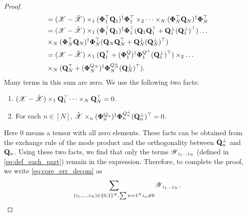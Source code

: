 \begin{proof}
\begin{equation}
\begin{aligned}
& =(\T{X} -  \tilde{\T{X}})\times_1 (\M{\Phi}^\top_1\M{Q}_1)^\dag \M{\Phi}^\top_1 \times_2\cdots \times_N (\M{\Phi}^\top_N\M{Q}_N)^\dag \M{\Phi}_N^\top \\
& =  (\T{X} -  \tilde{\T{X}}) \times_1 (\M{\Phi}^\top_1\M{Q}_1)^\dag \M{\Phi}^\top_1(\M{Q}_1\M{Q}_1^\top + \M{Q}_1^\bot (\M{Q}_1^\bot)^\top)\dots  \\
& \times_N (\M{\Phi}^\top_N\M{Q}_N)^\dag \M{\Phi}^\top_N(\M{Q}_N\M{Q}_N^\top + \M{Q}_N^\bot (\M{Q}_N^\bot)^\top)\\
& = (\T{X} -  \tilde{\T{X}}) \times_1 (\M{Q}_1^\top + (\M{\Phi}_1^Q)^\dag  \M{\Phi}_1^{Q^\bot}(\M{Q}_1^\bot)^\top)\times_2\dots \\
 &\times_N (\M{Q}_N^\top + (\M{\Phi}_N^{Q_N})^\dag  \M{\Phi}_N^{Q_N^\bot}(\M{Q}_N^\bot)^\top).
\end{aligned}
\end{equation}
Many terms in this sum are zero. We use the following two facts:
\begin{enumerate}
\item $(\T{X} - \tilde{\T{X}})\times_1 \M{Q}_1^\top\dots \times_N \M{Q}_N^\top = 0$.
\item For each $n \in [N]$, $\tilde{\T{X}}\times_n (\M{\Phi}_n^{Q_n})^\dag  \M{\Phi}_n^{Q_n^\bot}(\M{Q}_n^\bot)^\top =  0$.
\end{enumerate}
Here $0$ means a tensor with all zero elements.
These facts can be obtained from the exchange rule of the mode product and the orthogonality between $\mathbf{Q}_n^\bot$ and $\mathbf{Q}_n$.
Using these two facts, we find that only the terms $\T{Y}_{i_1\dots i_N}$ (defined in \eqref{eq:def_each_part})
remain in the expression.
Therefore, to complete the proof, we write \eqref{eq:core_err_decom} as
\begin{equation}
\sum_{(i_1,\dots, i_N) \in \{0,1\}^N, \sum{n=1}^N i_n\neq 0} \T{Y}_{i_1\dots i_N}.\nonumber
\end{equation}
\end{proof}


